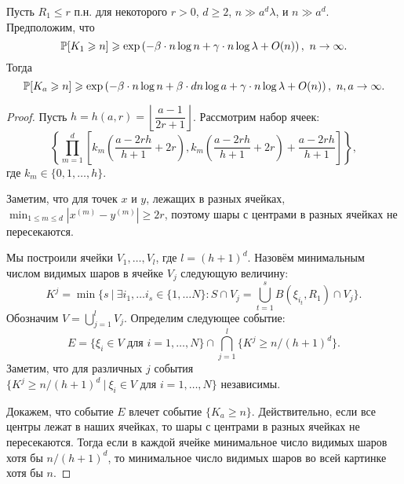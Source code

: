 \begin{thm}
Пусть $R_1\leq r$ п.н. для некоторого $r>0$, $d\geq 2$, $n \gg a^d\lambda$, и $n\gg a^d$. 
Предположим, что 
\begin{equation*}
    \mathbb{P}[K_1 \geqslant n] \geqslant \exp \left(-\beta\cdot n\log n + \gamma\cdot n\log\lambda + O(n)\right),\  n \to \infty.
 \end{equation*}{}
Тогда 
\begin{equation*}
    \mathbb{P}[K_a \geqslant n] \geqslant \exp \left(-\beta\cdot n\log n + \beta\cdot dn\log a + \gamma\cdot n\log\lambda + O(n)\right),\  n, a \to \infty.
\end{equation*}{}
\end{thm}

\begin{proof}
Пусть $h = h(a, r) = \left\lfloor\dfrac{a-1}{2r+1}\right\rfloor$. Рассмотрим набор ячеек:
\begin{equation*}
    \left\{\prod_{m = 1}^d\left[k_m\left(\dfrac{a - 2rh}{h+1} + 2r\right), k_m\left(\dfrac{a - 2rh}{h+1} + 2r\right) + \dfrac{a - 2rh}{h+1}\right]\right\},
\end{equation*}{}
где $k_m\in \{0, 1, \ldots, h\}$.

Заметим, что для точек $x$ и $y$, лежащих в разных ячейках, $\min_{1\leq m\leq d} |x^{(m)} - y^{(m)}| \geq 2r$, поэтому шары с центрами в разных ячейках не пересекаются. 

Мы построили ячейки $V_1, \ldots, V_l$, где $l = (h+1)^d$. Назовём минимальным числом видимых шаров в ячейке $V_j$ следующую величину:
\begin{equation*}
    K^j = \min\{s\ |\ \exists i_1, \ldots i_s \in \{1, \ldots N\} \colon S \cap V_j = \bigcup_{t = 1}^s B(\xi_{i_t}, R_1)\cap V_j \}.
\end{equation*}{}
Обозначим $V = \bigcup_{j=1}^l V_j$. 
Определим следующее событие:
\begin{equation*}
    E = \{\xi_i \in V \text{ для } i = 1, \ldots, N\} \cap \bigcap_{j = 1}^l\{K^j \geq n/(h+1)^d\}.
\end{equation*}{}
Заметим, что для различных $j$ события $\{K^j \geq n/(h+1)^d\ |\ \xi_i \in V \text{ для } i = 1, \ldots, N\}$ независимы.

Докажем, что событие $E$ влечет событие $\{K_a \geq n\}$. Действительно, если все центры лежат в наших ячейках, то шары с центрами в разных ячейках не пересекаются. Тогда если в каждой ячейке минимальное число видимых шаров хотя бы $n/(h+1)^d$, то минимальное число видимых шаров во всей картинке хотя бы $n$.


\end{proof}
